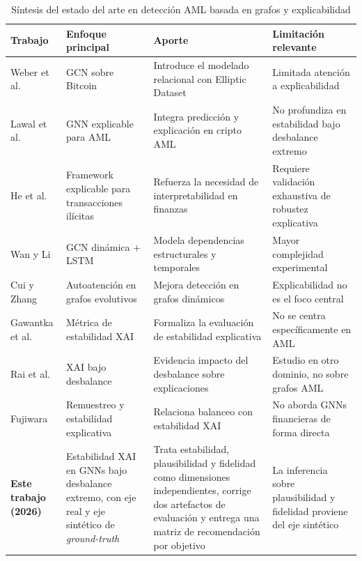 \bigskip

\begin{table}[h!]
\centering
\small
\begin{tabular}{|>{\raggedright\arraybackslash}p{2.6cm}|>{\raggedright\arraybackslash}p{3.4cm}|>{\raggedright\arraybackslash}p{4.1cm}|>{\raggedright\arraybackslash}p{4.0cm}|}
\hline
\textbf{Trabajo} & \textbf{Enfoque principal} & \textbf{Aporte} & \textbf{Limitación relevante} \\
\hline
Weber et al. \cite{Weber2019Anti-MoneyForensics} & GCN sobre Bitcoin & Introduce el modelado relacional con Elliptic Dataset & Limitada atención a explicabilidad \\
\hline
Lawal et al. \cite{Lawal2025AnDataset} & GNN explicable para AML & Integra predicción y explicación en cripto AML & No profundiza en estabilidad bajo desbalance extremo \\
\hline
He et al. \cite{He2026AnDetection} & Framework explicable para transacciones ilícitas & Refuerza la necesidad de interpretabilidad en finanzas & Requiere validación exhaustiva de robustez explicativa \\
\hline
Wan y Li \cite{Wan2024AMemory} & GCN dinámica + LSTM & Modela dependencias estructurales y temporales & Mayor complejidad experimental \\
\hline
Cui y Zhang \cite{Cui2024EG-SAN:Cryptocurrency} & Autoatención en grafos evolutivos & Mejora detección en grafos dinámicos & Explicabilidad no es el foco central \\
\hline
Gawantka et al. \cite{Gawantka2024AExplanations} & Métrica de estabilidad XAI & Formaliza la evaluación de estabilidad explicativa & No se centra específicamente en AML \\
\hline
Rai et al. \cite{Rai2025EvaluatingData} & XAI bajo desbalance & Evidencia impacto del desbalance sobre explicaciones & Estudio en otro dominio, no sobre grafos AML \\
\hline
Fujiwara \cite{Fujiwara2024KnowledgeStability} & Remuestreo y estabilidad explicativa & Relaciona balanceo con estabilidad XAI & No aborda GNNs financieras de forma directa \\
\hline
\textbf{Este trabajo (2026)} & Estabilidad XAI en GNNs bajo desbalance extremo, con eje real y eje sintético de \textit{ground-truth} & Trata estabilidad, plausibilidad y fidelidad como dimensiones independientes, corrige dos artefactos de evaluación y entrega una matriz de recomendación por objetivo & La inferencia sobre plausibilidad y fidelidad proviene del eje sintético \\
\hline
\end{tabular}
\caption{Síntesis del estado del arte en detección AML basada en grafos y explicabilidad}
\end{table}

